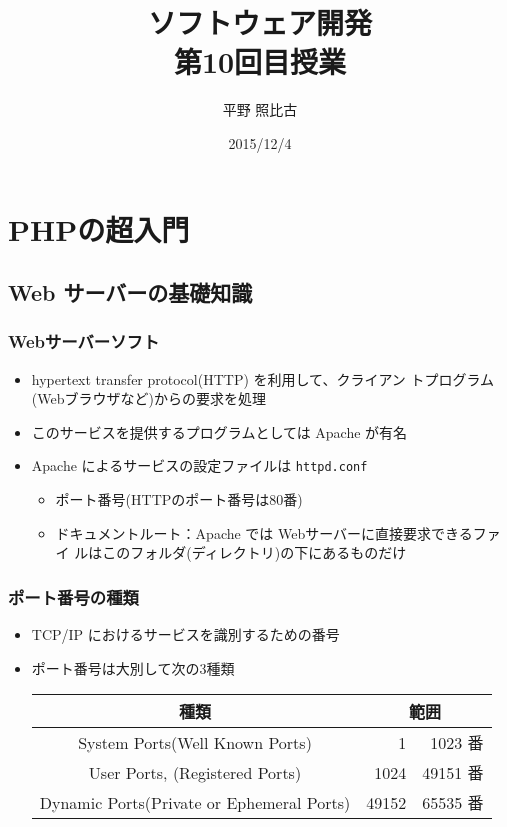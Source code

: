 \documentclass[dvipsk]{beamer}
\title{ソフトウェア開発\\第10回目授業}
\author{平野 照比古}
\institute{}
\date{2015/12/4}
\begin{document}
\frame{\maketitle}
\section{PHPの超入門}
\subsection{Web サーバーの基礎知識}
\begin{frame}[containsverbatim]
\frametitle{Webサーバーソフト}
\begin{itemize}
 \item hypertext transfer protocol(HTTP) を利用して、クライアン
トプログラム(Webブラウザなど)からの要求を処理
 \item このサービスを提供するプログラムとしては Apache が有名
 \item Apache によるサービスの設定ファイルは
       {\texttt{httpd.conf}}
\begin{itemize}
 \item ポート番号(HTTPのポート番号は80番)
 \item ドキュメントルート：Apache では Webサーバーに直接要求できるファイ
       ルはこのフォルダ(ディレクトリ)の下にあるものだけ
\end{itemize}
\end{itemize}
\end{frame}
\begin{frame}[containsverbatim]
\frametitle{ポート番号の種類}
\begin{itemize}
 \item TCP/IP におけるサービスを識別するための番号
 \item ポート番号は大別して次の3種類
\begin{center}
 \begin{tabular}{|c|r@{番$\sim$}r<{番}|%
}
\hline
種類 &\multicolumn{2}{c|}{範囲}%
 \\\hline
  System Ports(Well Known Ports)& 1&1023 %
\\ \hline
  User Ports, (Registered Ports)& 1024&49151 %
\\  \hline
  Dynamic Ports(Private or Ephemeral Ports)& 49152& 65535%
 \\ \hline
 \end{tabular}
\end{center}
\end{itemize}
\end{frame}
\end{document}
